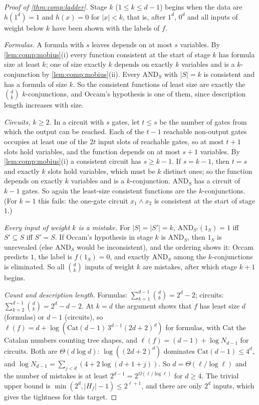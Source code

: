 \begin{proof}[Proof of \cref{thm:comp:ladder}]
Stage $k$ ($1\le k\le d-1$) begins when the data are $h(1^d)=1$ and $h(x)=0$ for $|x|<k$, that is, after $1^d$, $0^d$ and all inputs of weight below $k$ have been shown with the labels of $f$.

\emph{Formulas.} A formula with $s$ leaves depends on at most $s$ variables. By \cref{lem:comp:mobius}(i) every function consistent at the start of stage $k$ has formula size at least $k$; one of size exactly $k$ depends on exactly $k$ variables and is a $k$-conjunction by \cref{lem:comp:mobius}(ii). Every $\mathrm{AND}_S$ with $|S|=k$ is consistent and has a formula of size $k$. So the consistent functions of least size are exactly the $\binom dk$ $k$-conjunctions, and Occam's hypothesis is one of them, since description length increases with size.

\emph{Circuits, $k\ge2$.} In a circuit with $s$ gates, let $t\le s$ be the number of gates from which the output can be reached. Each of the $t-1$ reachable non-output gates occupies at least one of the $2t$ input slots of reachable gates, so at most $t+1$ slots hold variables, and the function depends on at most $s+1$ variables. By \cref{lem:comp:mobius}(i) a consistent circuit has $s\ge k-1$. If $s=k-1$, then $t=s$ and exactly $k$ slots hold variables, which must be $k$ distinct ones; so the function depends on exactly $k$ variables and is a $k$-conjunction. $\mathrm{AND}_S$ has a circuit of $k-1$ gates. So again the least-size consistent functions are the $k$-conjunctions. (For $k=1$ this fails: the one-gate circuit $x_1\wedge x_2$ is consistent at the start of stage $1$.)

\emph{Every input of weight $k$ is a mistake.} For $|S|=|S'|=k$, $\mathrm{AND}_{S'}(1_S)=1$ iff $S'\subseteq S$ iff $S'=S$. If Occam's hypothesis in stage $k$ is $\mathrm{AND}_S$, then $1_S$ is unrevealed (else $\mathrm{AND}_S$ would be inconsistent), and the ordering shows it: Occam predicts $1$, the label is $f(1_S)=0$, and exactly $\mathrm{AND}_S$ among the $k$-conjunctions is eliminated. So all $\binom dk$ inputs of weight $k$ are mistakes, after which stage $k+1$ begins.

\emph{Count and description length.} Formulas: $\sum_{k=1}^{d-1}\binom dk=2^d-2$; circuits: $\sum_{k=2}^{d-1}\binom dk=2^d-d-2$. At $k=d$ the argument shows that $f$ has least size $d$ (formulas) or $d-1$ (circuits), so $\ell(f)=d+\log(\mathrm{Cat}(d-1)\,3^{d-1}(2d+2)^d)$ for formulas, with $\mathrm{Cat}$ the Catalan numbers counting tree shapes, and $\ell(f)=(d-1)+\log N_{d-1}$ for circuits. Both are $\Theta(d\log d)$: $\log((2d+2)^d)$ dominates $\mathrm{Cat}(d-1)\le4^d$, and $\log N_{d-1}=\sum_{j<d}(4+2\log(d+1+j))$. So $d=\Theta(\ell/\log\ell)$ and the number of mistakes is at least $2^{d-1}=2^{\Omega(\ell/\log\ell)}$ for $d\ge4$. The trivial upper bound is $\min(2^d,|H_f|-1)\le2^{\ell+1}$, and there are only $2^d$ inputs, which gives the tightness for this target.
\end{proof}

